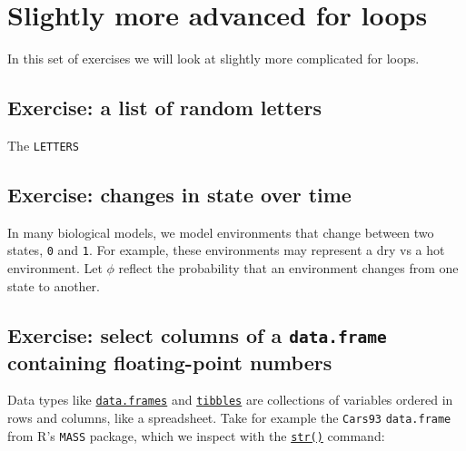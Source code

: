 \documentclass[
]{book}
\begin{document}
\hypertarget{slightly-more-advanced-for-loops}{%
\chapter{Slightly more advanced for loops}\label{slightly-more-advanced-for-loops}}

In this set of exercises we will look at slightly more complicated for loops.

\hypertarget{exercise-a-list-of-random-letters}{%
\section{Exercise: a list of random letters}\label{exercise-a-list-of-random-letters}}

The \texttt{LETTERS}

\hypertarget{exercise-changes-in-state-over-time}{%
\section{Exercise: changes in state over time}\label{exercise-changes-in-state-over-time}}

In many biological models, we model environments that change between two states, \texttt{0} and \texttt{1}. For example, these environments may represent a dry vs a hot environment. Let \(\phi\) reflect the probability that an environment changes from one state to another.

\hypertarget{exercise-select-columns-of-a-data.frame-containing-floating-point-numbers}{%
\section{\texorpdfstring{Exercise: select columns of a \texttt{data.frame} containing floating-point numbers}{Exercise: select columns of a data.frame containing floating-point numbers}}\label{exercise-select-columns-of-a-data.frame-containing-floating-point-numbers}}

Data types like \href{https://stat.ethz.ch/R-manual/R-devel/library/base/html/data.frame.html}{\texttt{data.frames}} and \href{https://tibble.tidyverse.org/}{\texttt{tibbles}} are collections of variables ordered in rows and columns, like a spreadsheet. Take for example the \texttt{Cars93} \texttt{data.frame} from R's \texttt{MASS} package, which we inspect with the \href{https://stat.ethz.ch/R-manual/R-devel/library/utils/html/str.html}{\texttt{str()}} command:
\end{document}
